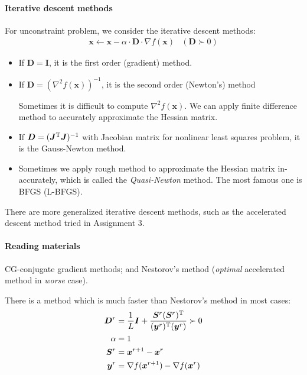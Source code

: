 \paragraph{Iterative descent methods}
For unconstraint problem, we consider the iterative descent methods:
\[
\begin{array}{ll}
\bm x \leftarrow \bm x-\alpha\cdot\bm D\cdot\nabla f(\bm x)
&
(\bm D\succ0)
\end{array}
\]
\begin{itemize}
\item
If $\bm D=\bm I$, it is the first order (gradient) method.
\item
If $\bm D=\left(\nabla^2f(\bm x)\right)^{-1}$, it is the second order (Newton's) method
\begin{remark}
Sometimes it is difficult to compute $\nabla^2f(\bm x)$. We can apply finite difference method to accurately approximate the Hessian matrix.
\end{remark}
\item
If $\bm D=(\bm J^{\mathrm T}\bm J)^{-1}$ with Jacobian matrix for nonlinear least squares problem, it is the Gauss-Newton method.
\item
Sometimes we apply rough method to approximate the Hessian matrix in-accurately, which is called the \emph{Quasi-Newton} method. The most famous one is BFGS (L-BFGS).
\end{itemize}
There are more generalized iterative descent methods, such as the accelerated descent method tried in Assignment 3.
\paragraph{Reading materials} CG-conjugate gradient methods; and Nestorov's method (\emph{optimal} accelerated method in \emph{worse} case).

There is a method which is much faster than Nestorov's method in most cases:
\begin{align*}
\bm D^r&=\frac{1}{L}\bm I+\frac{\bm S^r (\bm S^r)^{\mathrm T}}{(\bm y^r)^{\mathrm T}(\bm y^r)}\succ0\\
\alpha&=1\\
\bm S^r&=\bm x^{r+1} - \bm x^r\\
\bm y^r&=\nabla f(\bm x^{r+1}) - \nabla f(\bm x^r)
\end{align*}

